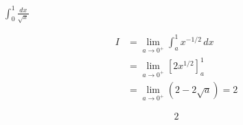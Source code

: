 $\displaystyle \int_{0}^{1} \frac{dx}{\sqrt{x}}$

\nopagebreak
\begin{align*}
I &= \lim_{a \to 0^+} \int_{a}^{1} x^{-1/2} \, dx \\
&= \lim_{a \to 0^+} \left[ 2x^{1/2} \right]_{a}^{1} \\
&= \lim_{a \to 0^+} (2 - 2\sqrt{a}) = 2
\end{align*}

\[
\boxed{\displaystyle 2}
\]
